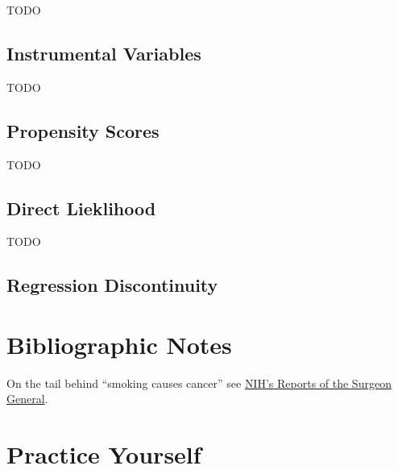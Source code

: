 \documentclass[]{book}
\theoremstyle{definition}
\theoremstyle{definition}
\theoremstyle{definition}
\theoremstyle{remark}
\begin{document}
TODO

\subsection{Instrumental Variables}\label{instrumental-variables}

TODO

\subsection{Propensity Scores}\label{propensity-scores}

TODO

\subsection{Direct Lieklihood}\label{direct-lieklihood}

TODO

\subsection{Regression Discontinuity}\label{regression-discontinuity}

\section{Bibliographic Notes}\label{bibliographic-notes-19}

On the tail behind ``smoking causes cancer'' see
\href{https://profiles.nlm.nih.gov/ps/retrieve/Narrative/NN/p-nid/60}{NIH's
Reports of the Surgeon General}.

\section{Practice Yourself}\label{practice-yourself-18}


\end{document}
